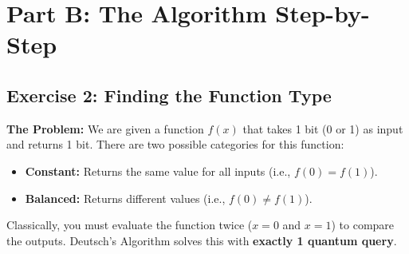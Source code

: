 \documentclass[a4paper,11pt]{article}
\begin{document}
\newpage

\section{Part B: The Algorithm Step-by-Step}

\subsection{Exercise 2: Finding the Function Type}
\textbf{The Problem:} We are given a function $f(x)$ that takes 1 bit (0 or 1) as input and returns 1 bit. 
There are two possible categories for this function:
\begin{itemize}
    \item \textbf{Constant:} Returns the same value for all inputs (i.e., $f(0) = f(1)$).
    \item \textbf{Balanced:} Returns different values (i.e., $f(0) \neq f(1)$).
\end{itemize}
Classically, you must evaluate the function twice ($x=0$ and $x=1$) to compare the outputs. Deutsch's Algorithm solves this with \textbf{exactly 1 quantum query}.
\end{document}
